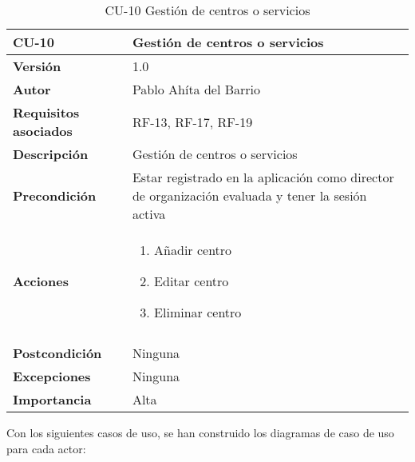 \begin{table}[p]
	\centering
	\begin{tabularx}{\linewidth}{ p{} p{} }
		\toprule
		\textbf{CU-10}    & \textbf{Gestión de centros o servicios}\\
		\toprule
		\textbf{Versión}              & 1.0    \\
		\textbf{Autor}                & Pablo Ahíta del Barrio \\
		\textbf{Requisitos asociados} & RF-13, RF-17, RF-19\\
		\textbf{Descripción}          & Gestión de centros o servicios\\
		\textbf{Precondición}         & Estar registrado en la aplicación como director de organización evaluada y tener la sesión activa \\
		\textbf{Acciones}             &
		\begin{enumerate}
			\def\labelenumi{\arabic{enumi}.}
			\tightlist
			\item Añadir centro
			\item Editar centro
			\item Eliminar centro
		\end{enumerate}\\
		\\
		\textbf{Postcondición}        & Ninguna \\
		\textbf{Excepciones}          & Ninguna \\
		\textbf{Importancia}          & Alta \\
		\bottomrule
	\end{tabularx}
	\caption{CU-10 Gestión de centros o servicios}
\end{table}

Con los siguientes casos de uso, se han construido los diagramas de caso de uso para cada actor:


